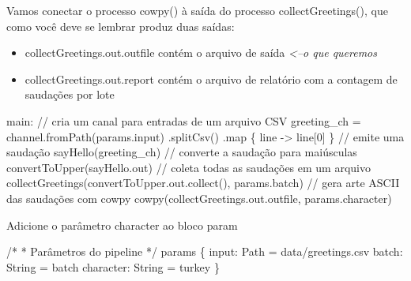 \documentclass[
  brazilian,
  letterpaper,
  DIV=11,
  numbers=noendperiod]{scrreprt}
\newenvironment{Shaded}{\begin{snugshade}}{\end{snugshade}}
\newcommand{\BuiltInTok}[1]{\textcolor[rgb]{0.00,0.23,0.31}{#1}}
\newcommand{\CommentTok}[1]{\textcolor[rgb]{0.37,0.37,0.37}{#1}}
\newcommand{\DecValTok}[1]{\textcolor[rgb]{0.68,0.00,0.00}{#1}}
\newcommand{\FunctionTok}[1]{\textcolor[rgb]{0.28,0.35,0.67}{#1}}
\newcommand{\NormalTok}[1]{\textcolor[rgb]{0.00,0.23,0.31}{#1}}
\newcommand{\OperatorTok}[1]{\textcolor[rgb]{0.37,0.37,0.37}{#1}}
\newcommand{\StringTok}[1]{\textcolor[rgb]{0.13,0.47,0.30}{#1}}
\providecommand{\tightlist}{%
  \setlength{\itemsep}{0pt}\setlength{\parskip}{0pt}}
\begin{document}
\begin{tcolorbox}
Vamos conectar o processo cowpy() à saída do processo
collectGreetings(), que como você deve se lembrar produz duas saídas:

\begin{itemize}
\tightlist
\item
  collectGreetings.out.outfile contém o arquivo de saída
  \emph{\textless--o que queremos}
\item
  collectGreetings.out.report contém o arquivo de relatório com a
  contagem de saudações por lote
\end{itemize}

\begin{Shaded}
\begin{Highlighting}[]
\NormalTok{    main}\OperatorTok{:}
    \CommentTok{// cria um canal para entradas de um arquivo CSV}
\NormalTok{    greeting\_ch }\OperatorTok{=}\NormalTok{ channel}\OperatorTok{.}\FunctionTok{fromPath}\OperatorTok{(}\NormalTok{params}\OperatorTok{.}\NormalTok{input}\OperatorTok{)}
                        \OperatorTok{.}\FunctionTok{splitCsv}\OperatorTok{()}
                        \OperatorTok{.}\FunctionTok{map} \OperatorTok{\{}\NormalTok{ line }\OperatorTok{{-}\textgreater{}}\NormalTok{ line}\OperatorTok{[}\DecValTok{0}\OperatorTok{]} \OperatorTok{\}}
    \CommentTok{// emite uma saudação}
    \FunctionTok{sayHello}\OperatorTok{(}\NormalTok{greeting\_ch}\OperatorTok{)}
    \CommentTok{// converte a saudação para maiúsculas}
    \FunctionTok{convertToUpper}\OperatorTok{(}\NormalTok{sayHello}\OperatorTok{.}\NormalTok{out}\OperatorTok{)}
    \CommentTok{// coleta todas as saudações em um arquivo}
    \FunctionTok{collectGreetings}\OperatorTok{(}\NormalTok{convertToUpper}\OperatorTok{.}\NormalTok{out}\OperatorTok{.}\FunctionTok{collect}\OperatorTok{(),}\NormalTok{ params}\OperatorTok{.}\NormalTok{batch}\OperatorTok{)}
    \CommentTok{// gera arte ASCII das saudações com cowpy}
    \FunctionTok{cowpy}\OperatorTok{(}\NormalTok{collectGreetings}\OperatorTok{.}\NormalTok{out}\OperatorTok{.}\NormalTok{outfile}\OperatorTok{,}\NormalTok{ params}\OperatorTok{.}\NormalTok{character}\OperatorTok{)}
\end{Highlighting}
\end{Shaded}

Adicione o parâmetro character ao bloco param

\begin{Shaded}
\begin{Highlighting}[]
\CommentTok{/*}
\CommentTok{* Parâmetros do pipeline}
\CommentTok{*/}
\NormalTok{params }\OperatorTok{\{}
\NormalTok{    input}\OperatorTok{:}\NormalTok{ Path }\OperatorTok{=} \StringTok{\textquotesingle{}data/greetings.csv\textquotesingle{}}
\NormalTok{    batch}\OperatorTok{:} \BuiltInTok{String} \OperatorTok{=} \StringTok{\textquotesingle{}batch\textquotesingle{}}
\NormalTok{    character}\OperatorTok{:} \BuiltInTok{String} \OperatorTok{=} \StringTok{\textquotesingle{}turkey\textquotesingle{}}
\OperatorTok{\}}
\end{Highlighting}
\end{Shaded}


\end{tcolorbox}
\end{document}
